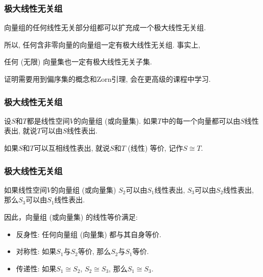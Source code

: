 \documentclass[CJK]{beamer}
\begin{document}
\begin{frame}
	\frametitle{极大线性无关组} \pause
	\begin{theorem}
		向量组的任何线性无关部分组都可以扩充成一个极大线性无关组.
	\end{theorem} \pause

\vspace{0.5cm}
 
 所以, 任何含非零向量的向量组一定有极大线性无关组. \pause 事实上,
 
\vspace{0.5cm}

	\begin{theorem}
		任何 (无限) 向量集也一定有极大线性无关子集.
	\end{theorem} \pause

\vspace{0.5cm}

证明需要用到偏序集的概念和Zorn引理, 会在更高级的课程中学习.
\end{frame}

\begin{frame}
	\frametitle{极大线性无关组} \pause
	\begin{definition}
		设$S$和$T$都是线性空间$V$的向量组 (或向量集). 如果$T$中的每一个向量都可以由$S$线性表出, 就说$T$可以由$S$线性表出. 
		
		如果$S$和$T$可以互相线性表出, 就说$S$和$T$ (线性) 等价, 记作$S\cong T$.
	\end{definition}
\end{frame}

\begin{frame}
	\frametitle{极大线性无关组} \pause
	\begin{theorem}
		如果线性空间$V$的向量组 (或向量集) $S_{2}$可以由$S_{1}$线性表出, $S_{3}$可以由$S_{2}$线性表出, 那么$S_{3}$可以由$S_{1}$线性表出.
	\end{theorem} \pause
\vspace{0.5cm}

因此，向量组 (或向量集) 的线性等价满足: \pause \begin{itemize}
	\item 反身性: 任何向量组 (向量集) 都与其自身等价. \pause
	\item 对称性: 如果$S_{1}$与$S_{2}$等价, 那么$S_{2}$与$S_{1}$等价. \pause
	\item 传递性: 如果$S_{1}\cong S_{2}$, $S_{2}\cong S_{3}$, 那么$S_{1}\cong S_{3}$.
\end{itemize}
\end{frame}
\end{document}
